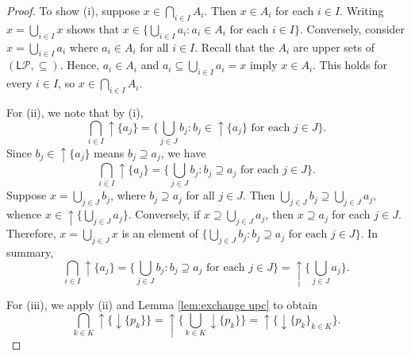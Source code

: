 \documentclass[12pt]{article}
\theoremstyle{definition}
\theoremstyle{plain}
\theoremstyle{plain}
\theoremstyle{plain}
\theoremstyle{plain}
\theoremstyle{remark}
\theoremstyle{remark}
\newcommand{\mc}[1]{\mathcal{#1}}
\newcommand{\sub}{\subseteq}
\newcommand{\low}{\mathsf{L}}
\newcommand{\upc}[1]{{\uparrow #1}}
\newcommand{\lwc}[1]{{\downarrow #1}}
\begin{document}
\begin{proof}
	To show (i), suppose $x \in \bigcap_{i \in I} A_i$. Then $x \in A_i$ for each $i \in I$. Writing $x = \bigcup_{i \in I} x$ shows that $x \in \{ \bigcup_{i \in I} a_i : a_i \in A_i \text{ for each } i \in I \}$. Conversely, consider $x = \bigcup_{i \in I} a_i$ where $a_i \in A_i$ for all $i \in I$. Recall that the $A_i$ are upper sets of $(\low\mc{P},\sub)$. Hence, $a_i \in A_i$ and $a_i \sub \bigcup_{i \in I} a_i = x$ imply $x \in A_i$. This holds for every $i \in I$, so $x \in \bigcap_{i \in I} A_i$.
	
	For (ii), we note that by (i), 
	$$\bigcap_{i \in I} \upc{\{a_j\}} = \{ \bigcup_{j \in J} b_j : b_j \in \upc{\{a_j\}}  \text{ for each } j \in J \}.$$
	Since $b_j \in \upc{\{a_j\}}$ means $b_j \supseteq a_j$, we have
	$$\bigcap_{i \in I} \upc{\{a_j\}} = \{ \bigcup_{j \in J} b_j : b_j \supseteq a_j \text{ for each } j \in J \}.$$ 
	Suppose $x = \bigcup_{j \in J} b_j$, where $b_j \supseteq a_j$ for all $j \in J$. Then $\bigcup_{j \in J} b_j \supseteq \bigcup_{j \in J} a_j $, whence $x \in \upc{ \{ \bigcup_{j \in J} a_j \}}$. Conversely, if $x \supseteq \bigcup_{j \in J} a_j$, then $x \supseteq  a_j$ for each $j \in J$. Therefore, $x = \bigcup_{j \in J} x$ is an element of $\{ \bigcup_{j \in J} b_j : b_j \supseteq a_j \text{ for each } j \in J \}$. In summary,
	$$\bigcap_{i \in I} \upc{\{a_j\}} = \{ \bigcup_{j \in J} b_j : b_j \supseteq a_j \text{ for each } j \in J \} = \upc{ \{ \bigcup_{j \in J} a_j \}}.$$ 
	
	For (iii), we apply (ii) and Lemma \ref{lem:exchange upc} to obtain
	$$ \bigcap_{k \in K} \upc{\{ \lwc{\{p_k\}} \}} =  \upc{ \{ \bigcup_{k \in K} \lwc{\{p_k\}} \}} = \upc{ \{ \lwc{ \{p_k\}_{k \in K} } \}}.$$
\end{proof}
\end{document}

